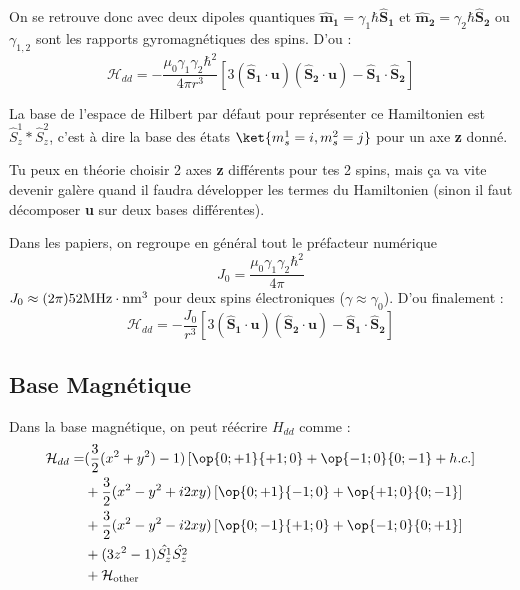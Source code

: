 \documentclass[a4paper]{article}
\begin{document}
 On se retrouve donc avec deux dipoles quantiques $\mathbf{\hat{m}_1}= \gamma_1 \hbar \mathbf{\hat{S}_1}$ et $\mathbf{\hat{m}_2}= \gamma_2 \hbar \mathbf{\hat{S}_2}$ ou $\gamma_{1,2}$ sont les rapports gyromagnétiques des spins. D'ou : 
 \begin{equation}
  \mathcal{H}_{dd}=-\frac{\mu_0 \gamma_1 \gamma_2 \hbar ^2}{4 \pi r^3}[3(\mathbf{\hat{S}_1}\cdot \mathbf{u})(\mathbf{\hat{S}_2}\cdot \mathbf{u})-\mathbf{\hat{S}_1}\cdot \mathbf{\hat{S}_2}]
  \end{equation}
  
  La base de l'espace de Hilbert par défaut pour représenter ce Hamiltonien est $\hat{S}_z^1 \ast \hat{S}_z^2$, c'est à dire la base des états $\ket{m_s^1=i,m_s^2=j}$ pour un axe \textbf{z} donné. 
  
  Tu peux en théorie choisir 2 axes \textbf{z} différents pour tes 2 spins, mais ça va vite devenir galère quand il faudra développer les termes du Hamiltonien (sinon il faut décomposer \textbf{u} sur deux bases différentes).
  
  Dans les papiers, on regroupe en général tout le préfacteur numérique 
  \begin{equation}
  J_0=\frac{\mu_0 \gamma_1 \gamma_2 \hbar ^2}{4 \pi}
  \end{equation}
  $J_0 \approx (2\pi)52 \textrm{MHz} \cdot \rm{nm}^3$ pour deux spins électroniques ($\gamma \approx \gamma_0$). D'ou finalement :
   \begin{equation}
  \mathcal{H}_{dd}=-\frac{J_0}{r^3}[3(\mathbf{\hat{S}_1}\cdot \mathbf{u})(\mathbf{\hat{S}_2}\cdot \mathbf{u})-\mathbf{\hat{S}_1}\cdot \mathbf{\hat{S}_2}]
  \end{equation}
  \subsection{Base Magnétique}
  Dans la base magnétique, on peut réécrire $H_{dd}$ comme :
  \begin{align}
  \mathcal{H}_{dd}=&(\frac{3}{2}(x^2+y^2)-1)\left[\op{0;+1}{+1;0}+\op{-1;0}{0;-1} + h.c. \right]\\
  &+\frac{3}{2}(x^2-y^2+i2xy)\left[\op{0;+1}{-1;0}+\op{+1;0}{0;-1}\right]\\
  &+\frac{3}{2}(x^2-y^2-i2xy)\left[\op{0;-1}{+1;0}+\op{-1;0}{0;+1}\right]\\
  &+(3z^2-1)\hat{S_z^1}\hat{S_z^2}\\
  &+\mathcal{H}_{\mathrm{other}}
  \end{align}
  
\end{document}
